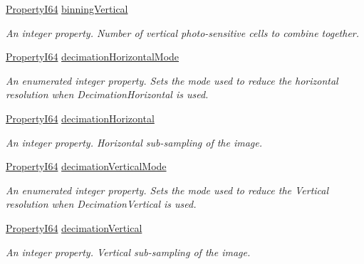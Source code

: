 \begin{DoxyCompactItemize}
\hyperlink{group___common_interface_ga81749b2696755513663492664a18a893}{Property\+I64} \hyperlink{classmv_i_m_p_a_c_t_1_1acquire_1_1_gen_i_cam_1_1_image_format_control_ac766f2fc87ea58efeb031ccdd83d204a}{binning\+Vertical}
\begin{DoxyCompactList}\small\item\em An integer property. Number of vertical photo-\/sensitive cells to combine together. \end{DoxyCompactList}\item 
\hyperlink{group___common_interface_ga81749b2696755513663492664a18a893}{Property\+I64} \hyperlink{classmv_i_m_p_a_c_t_1_1acquire_1_1_gen_i_cam_1_1_image_format_control_ae8eae7ba917fb06636756e081796006b}{decimation\+Horizontal\+Mode}
\begin{DoxyCompactList}\small\item\em An enumerated integer property. Sets the mode used to reduce the horizontal resolution when Decimation\+Horizontal is used. \end{DoxyCompactList}\item 
\hyperlink{group___common_interface_ga81749b2696755513663492664a18a893}{Property\+I64} \hyperlink{classmv_i_m_p_a_c_t_1_1acquire_1_1_gen_i_cam_1_1_image_format_control_af3c2ae5e5f9aaea7a762f3cd10ce1ebb}{decimation\+Horizontal}
\begin{DoxyCompactList}\small\item\em An integer property. Horizontal sub-\/sampling of the image. \end{DoxyCompactList}\item 
\hyperlink{group___common_interface_ga81749b2696755513663492664a18a893}{Property\+I64} \hyperlink{classmv_i_m_p_a_c_t_1_1acquire_1_1_gen_i_cam_1_1_image_format_control_a81098f47bf7166c3b8abb47fde14ed85}{decimation\+Vertical\+Mode}
\begin{DoxyCompactList}\small\item\em An enumerated integer property. Sets the mode used to reduce the Vertical resolution when Decimation\+Vertical is used. \end{DoxyCompactList}\item 
\hyperlink{group___common_interface_ga81749b2696755513663492664a18a893}{Property\+I64} \hyperlink{classmv_i_m_p_a_c_t_1_1acquire_1_1_gen_i_cam_1_1_image_format_control_aee18567f6502e019607cab86903a68af}{decimation\+Vertical}
\begin{DoxyCompactList}\small\item\em An integer property. Vertical sub-\/sampling of the image. \end{DoxyCompactList}\item 

\end{DoxyCompactItemize}
